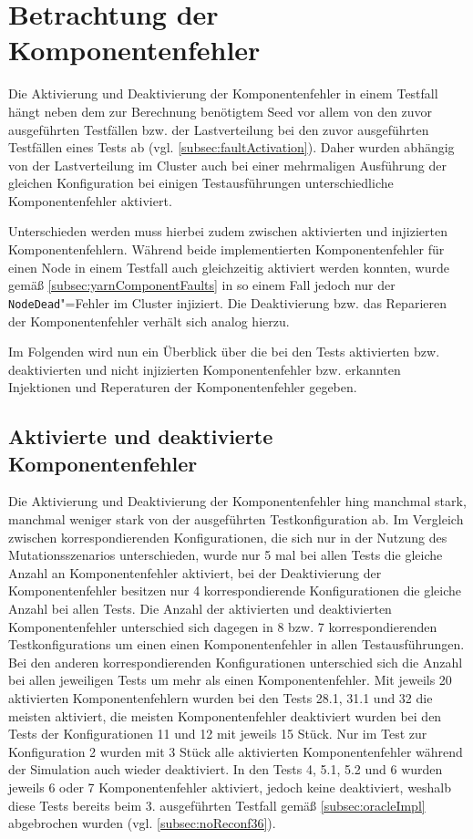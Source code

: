 \section{Betrachtung der Komponentenfehler}
\label{sec:faultEval}

Die Aktivierung und Deaktivierung der Komponentenfehler in einem \gls{Testfall} hängt neben dem zur Berechnung benötigtem Seed vor allem von den zuvor ausgeführten Testfällen bzw. der Lastverteilung bei den zuvor ausgeführten Testfällen eines \glspl{Test} ab (vgl. \cref{subsec:faultActivation}).
Daher wurden abhängig von der Lastverteilung im Cluster auch bei einer mehrmaligen Ausführung der gleichen Konfiguration bei einigen Testausführungen unterschiedliche Komponentenfehler aktiviert.

Unterschieden werden muss hierbei zudem zwischen aktivierten und injizierten Komponentenfehlern.
Während beide implementierten Komponentenfehler für einen Node in einem \gls{Testfall} auch gleichzeitig aktiviert werden konnten, wurde gemäß \cref{subsec:yarnComponentFaults} in so einem Fall jedoch nur der \texttt{NodeDead}"=Fehler im Cluster injiziert.
Die Deaktivierung bzw. das Reparieren der Komponentenfehler verhält sich analog hierzu.

Im Folgenden wird nun ein Überblick über die bei den \glspl{Test} aktivierten bzw. deaktivierten und nicht injizierten Komponentenfehler bzw. erkannten Injektionen und Reperaturen der Komponentenfehler gegeben.

\subsection{Aktivierte und deaktivierte Komponentenfehler}
\label{subsec:actDeactFaults}

Die Aktivierung und Deaktivierung der Komponentenfehler hing manchmal stark, manchmal weniger stark von der ausgeführten \gls{Testkonfiguration} ab.
Im Vergleich zwischen korrespondierenden Konfigurationen, die sich nur in der Nutzung des Mutationsszenarios unterschieden, wurde nur 5 mal bei allen \glspl{Test} die gleiche Anzahl an Komponentenfehler aktiviert, bei der Deaktivierung der Komponentenfehler besitzen nur 4 korrespondierende Konfigurationen die gleiche Anzahl bei allen Tests.
Die Anzahl der aktivierten und deaktivierten Komponentenfehler unterschied sich dagegen in 8 bzw. 7 korrespondierenden \glspl{Testkonfiguration} um einen einen Komponentenfehler in allen Testausführungen.
Bei den anderen korrespondierenden Konfigurationen unterschied sich die Anzahl bei allen jeweiligen \glspl{Test} um mehr als einen Komponentenfehler.
Mit jeweils 20 aktivierten Komponentenfehlern wurden bei den \glspl{Test} 28.1, 31.1 und 32 die meisten aktiviert, die meisten Komponentenfehler deaktiviert wurden bei den \glspl{Test} der Konfigurationen 11 und 12 mit jeweils 15 Stück.
Nur im \gls{Test} zur Konfiguration 2 wurden mit 3 Stück alle aktivierten Komponentenfehler während der Simulation auch wieder deaktiviert.
In den \glspl{Test} 4, 5.1, 5.2 und 6 wurden jeweils 6 oder 7 Komponentenfehler aktiviert, jedoch keine deaktiviert, weshalb diese \glspl{Test} bereits beim 3. ausgeführten \gls{Testfall} gemäß \cref{subsec:oracleImpl} abgebrochen wurden (vgl. \cref{subsec:noReconf36}).

